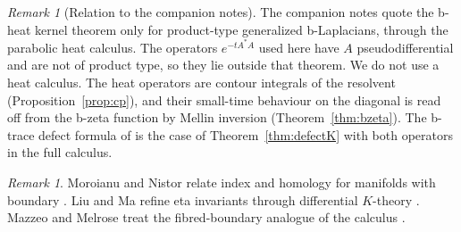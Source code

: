 \documentclass[11pt,oneside,reqno]{article}
\theoremstyle{plain}
\theoremstyle{definition}
\theoremstyle{remark}
\newtheorem{remark}[theorem]{Remark}
\begin{document}
\begin{remark}[Relation to the companion notes]\label{rem:companion-heat}
The companion notes \cite{Notes} quote the b-heat kernel theorem only for
product-type generalized b-Laplacians, through the parabolic heat
calculus. The operators \(e^{-tA^*A}\) used here have \(A\)
pseudodifferential and are not of product type, so they lie outside that
theorem. We do not use a heat calculus. The heat operators are contour
integrals of the resolvent (Proposition~\ref{prop:cp}), and their small-time
behaviour on the diagonal is read off from the b-zeta function by Mellin
inversion (Theorem~\ref{thm:bzeta}). The b-trace defect formula of
\cite{Notes} is the case of Theorem~\ref{thm:defectK} with both operators
in the full calculus.
\end{remark}

\begin{remark}
Moroianu and Nistor relate index and homology for manifolds with boundary
\cite{MoroianuNistor}. Liu and Ma refine eta invariants through
differential \(K\)-theory \cite{LMlocalization}. Mazzeo and Melrose treat
the fibred-boundary analogue of the calculus \cite{MazzeoMelrose}.
\end{remark}
\end{document}
